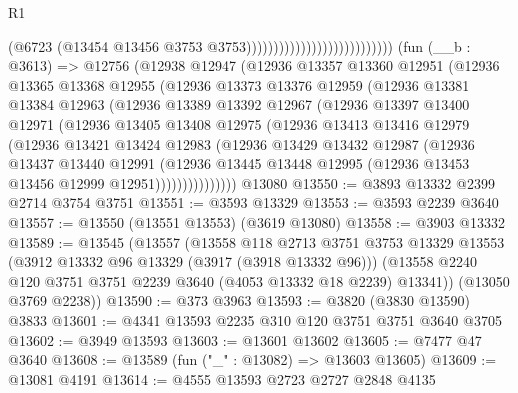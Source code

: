 \begin{lexlean}{R1}
\begin{coremodule}
                                                      (@6723
                                                        (@13454
                                                          @13456
                                                          @3753
                                                          @3753)))))))))))))))))))))))))))
    (fun (__b : @3613) =>
    @12756
      (@12938
        @12947
        (@12936
          @13357
          @13360
          @12951
          (@12936
            @13365
            @13368
            @12955
            (@12936
              @13373
              @13376
              @12959
              (@12936
                @13381
                @13384
                @12963
                (@12936
                  @13389
                  @13392
                  @12967
                  (@12936
                    @13397
                    @13400
                    @12971
                    (@12936
                      @13405
                      @13408
                      @12975
                      (@12936
                        @13413
                        @13416
                        @12979
                        (@12936
                          @13421
                          @13424
                          @12983
                          (@12936
                            @13429
                            @13432
                            @12987
                            (@12936
                              @13437
                              @13440
                              @12991
                              (@12936
                                @13445
                                @13448
                                @12995
                                (@12936 @13453 @13456 @12999 @12951)))))))))))))))
    @13080
@13550 := @3893 @13332 @2399 @2714 @3754 @3751
@13551 := @3593 @13329
@13553 := @3593 @2239 @3640
@13557 := @13550 (@13551 @13553) (@3619 @13080)
@13558 := @3903 @13332
@13589 := @13545
    (@13557
      (@13558
        @118
        @2713
        @3751
        @3753
        @13329
        @13553
        (@3912 @13332 @96 @13329 (@3917 (@3918 @13332 @96)))
        (@13558 @2240 @120 @3751 @3751 @2239 @3640 (@4053 @13332 @18 @2239) @13341))
      (@13050 @3769 @2238))
@13590 := @373 @3963
@13593 := @3820 (@3830 @13590) @3833
@13601 := @4341 @13593 @2235 @310 @120 @3751 @3751 @3640 @3705
@13602 := @3949 @13593
@13603 := @13601 @13602
@13605 := @7477 @47 @3640
@13608 := @13589 (fun ("_" : @13082) => @13603 @13605)
@13609 := @13081 @4191
@13614 := @4555 @13593 @2723 @2727 @2848 @4135

\end{coremodule}
\end{lexlean}
